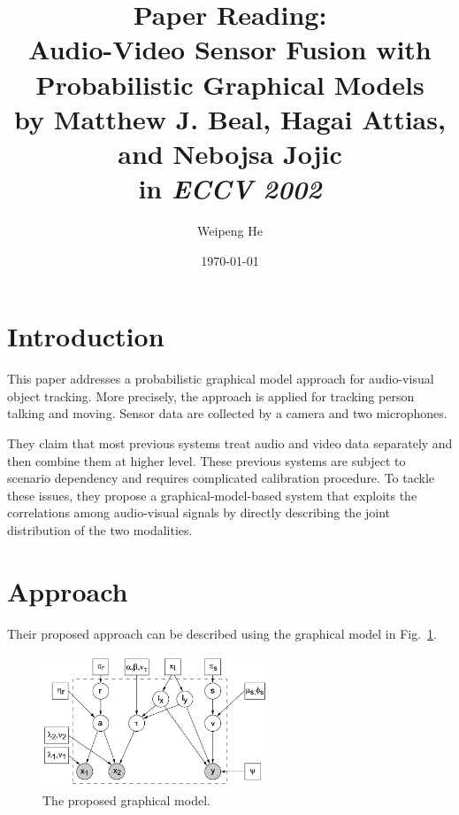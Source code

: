 \documentclass[11pt,a4paper]{article}
\begin{document}
\title{%
  \large Paper Reading:\\
  \Large \textbf{Audio-Video Sensor Fusion with Probabilistic Graphical Models}\\
  \large by Matthew J. Beal, Hagai Attias, and Nebojsa Jojic\\
  \large in \textit{ECCV 2002}
}
\author{Weipeng He}
\date{\today}
\maketitle

\section{Introduction}

This paper addresses a probabilistic graphical model approach for audio-visual object tracking. More precisely, the approach is applied for tracking person talking and moving. Sensor data are collected by a camera and two microphones.

They claim that most previous systems treat audio and video data separately and then combine them at higher level. These previous systems are subject to scenario dependency and requires complicated calibration procedure. To tackle these issues, they propose a graphical-model-based system that exploits the correlations among audio-visual signals by directly describing the joint distribution of the two modalities.

\section{Approach}

Their proposed approach can be described using the graphical model in Fig.~\ref{fig:model}. 

\begin{figure}
  \centering
  \includegraphics[width=0.6\textwidth]{model}
  \caption{The proposed graphical model.}
  \label{fig:model}
\end{figure}
\end{document}
